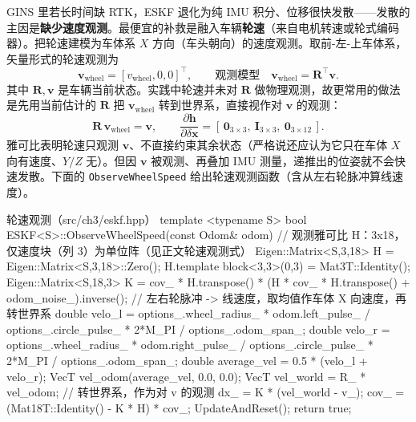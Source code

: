 GINS 里若长时间缺 RTK，ESKF 退化为纯 IMU 积分、位移很快发散——发散的主因是\textbf{缺少速度观测}\cite{gao2023slamad}。最便宜的补救是融入车辆\textbf{轮速}（来自电机转速或轮式编码器）。把轮速建模为车体系 $X$ 方向（车头朝向）的速度观测。取前-左-上车体系，矢量形式的轮速观测为
\begin{equation}
\label{eq:gins-wheel}
\mathbf{v}_{\text{wheel}}=[v_{\text{wheel}},0,0]^\top,\qquad\text{观测模型}\quad \mathbf{v}_{\text{wheel}}=\mathbf{R}^\top\mathbf{v}.
\end{equation}
其中 $\mathbf{R},\mathbf{v}$ 是车辆当前状态。实践中轮速并未对 $\mathbf{R}$ 做物理观测，故更常用的做法是先用当前估计的 $\mathbf{R}$ 把 $\mathbf{v}_{\text{wheel}}$ 转到世界系，直接视作对 $\mathbf{v}$ 的观测\cite{gao2023slamad}：
\begin{equation}
\label{eq:gins-wheel-world}
\mathbf{R}\,\mathbf{v}_{\text{wheel}}=\mathbf{v},\qquad
\frac{\partial\mathbf{h}}{\partial\delta\mathbf{x}}=[\,\mathbf{0}_{3\times3},\ \mathbf{I}_{3\times3},\ \mathbf{0}_{3\times12}\,].
\end{equation}
雅可比表明轮速只观测 $\mathbf{v}$、不直接约束其余状态（严格说还应认为它只在车体 $X$ 向有速度、$Y/Z$ 无）。但因 $\mathbf{v}$ 被观测、再叠加 IMU 测量，递推出的位姿就不会快速发散。下面的 \texttt{ObserveWheelSpeed} 给出轮速观测函数（含从左右轮脉冲算线速度）。

\begin{codebox}[C++]{轮速观测（src/ch3/eskf.hpp）}
template <typename S>
bool ESKF<S>::ObserveWheelSpeed(const Odom& odom) {
  // 观测雅可比 H：3x18，仅速度块（列 3）为单位阵（见正文轮速观测式）
  Eigen::Matrix<S,3,18> H = Eigen::Matrix<S,3,18>::Zero();
  H.template block<3,3>(0,3) = Mat3T::Identity();
  Eigen::Matrix<S,18,3> K = cov_ * H.transpose() * (H * cov_ * H.transpose() + odom_noise_).inverse();
  // 左右轮脉冲 -> 线速度，取均值作车体 X 向速度，再转世界系
  double velo_l = options_.wheel_radius_ * odom.left_pulse_  / options_.circle_pulse_ * 2*M_PI / options_.odom_span_;
  double velo_r = options_.wheel_radius_ * odom.right_pulse_ / options_.circle_pulse_ * 2*M_PI / options_.odom_span_;
  double average_vel = 0.5 * (velo_l + velo_r);
  VecT vel_odom(average_vel, 0.0, 0.0);
  VecT vel_world = R_ * vel_odom;            // 转世界系，作为对 v 的观测
  dx_  = K * (vel_world - v_);
  cov_ = (Mat18T::Identity() - K * H) * cov_;
  UpdateAndReset();
  return true;
}
\end{codebox}

